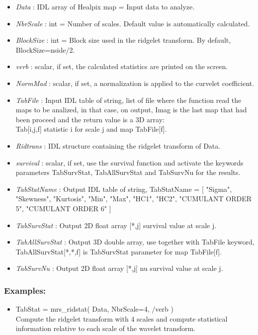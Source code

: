\begin{itemize}
\item {\em Data} : IDL array of Healpix map = Input data to analyze. 
\item {\em NbrScale} : int = Number of scales. Default value is automatically calculated.  
\item {\em BlockSize} : int = Block size used in the ridgelet transform. By default, BlockSize=nside/2.
\item {\em verb} : scalar, if set, the calculated statistics are printed on the screen.
\item {\em NormMad} : scalar, if set, a normalization is applied to the curvelet coefficient.
\item {\em TabFile} : Input IDL table of string, list of file where the function read the maps to be analized, in that case, on output, 
Imag is the last map that had been proceed and the return value is a 3D array:\\
Tab[i,j,f] \qquad statistic i for scale j and map TabFile[f].
\item {\em Ridtrans} : IDL structure containing the ridgelet transform of Data.
\item {\em survival} : scalar, if set, use the survival function and activate the keywords parameters 
TabSurvStat, TabAllSurvStat and TabSurvNu for the results.
\item {\em TabStatName} : Output IDL table of string, TabStatName = [ "Sigma", "Skewness", "Kurtosis", "Min", "Max", "HC1", "HC2", "CUMULANT ORDER 5", "CUMULANT ORDER 6" ]
\item {\em TabSurvStat} : Output 2D float array [*,j] survival value at scale j.
\item {\em TabAllSurvStat} : Output 3D double array, use together with TabFile keyword, TabAllSurvStat[*,*,f] is TabSurvStat parameter for map TabFile[f].
\item {\em TabSurvNu} : Output 2D float array [*,j] nu survival value at scale j.
\end{itemize}

\subsubsection*{Examples:} 
\begin{itemize}
\item TabStat = mrs\_ridstat( Data, NbrScale=4, /verb ) \\
Compute the ridgelet transform with 4 scales and compute statistical information relative to each scale of the wavelet transform.
\end{itemize}



